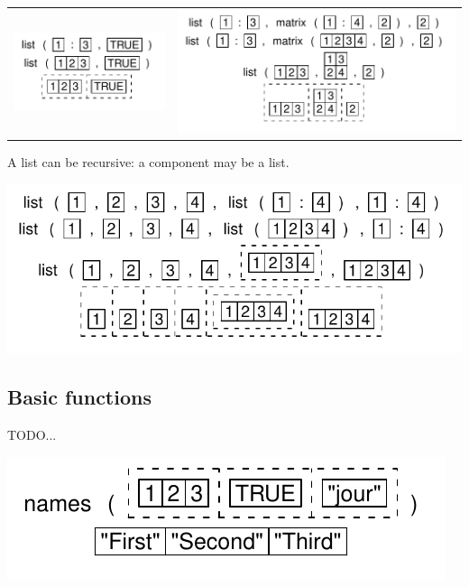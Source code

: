 \documentclass[pdflatex]{article}
\begin{document}
\begin{tabular}{cc}
\includegraphics{list_twotypes.pdf} & \includegraphics{list_matrix.pdf}
\end{tabular}

A list can be recursive: a component may be a list.

\includegraphics{list_complex.pdf}


\subsection{Basic functions}

TODO...

\includegraphics{list_names}
\end{document}
